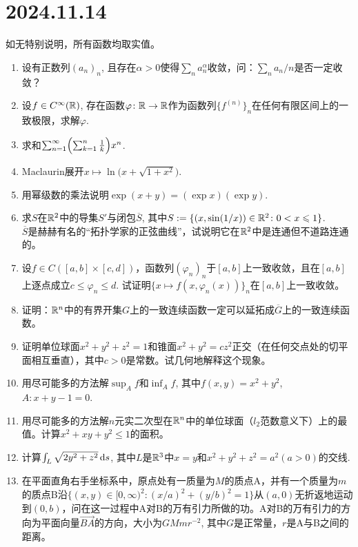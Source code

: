 \section*{2024.11.14}
如无特别说明，所有函数均取实值。
\begin{enumerate}
    \item 设有正数列$(a_n)_n$, 且存在$\alpha>0$使得$\sum_{n} a_n^\alpha$收敛，问：$\sum_{n}a_n/n$是否一定收敛？
    \item 设$f\in C^\infty(\mathbb{R})$, 存在函数$\varphi\colon\mathbb{R}\to\mathbb{R}$作为函数列$\bigl\{f^{(n)}\bigr\}_n$在任何有限区间上的一致极限，求解$\varphi$.
    \item 求和$\sum_{n=1}^\infty \Bigl(\sum_{k=1}^{n}\frac{1}{k}\Bigr) x^n$.
    \item Maclaurin展开$x\mapsto \ln \bigl(x+\sqrt{1+x^2}\bigr)$.
    \item 用幂级数的乘法说明$\exp (x+y)=(\exp x)(\exp y)$.
    \item 求$S$在$\mathbb{R}^2$中的导集$S'$与闭包$\overline S$, 其中$S:=\{(x,\sin (1/x))\in\mathbb{R}^2\colon 0<x\leqslant1\}$.\\
    $\overline S$是赫赫有名的``拓扑学家的正弦曲线''，试说明它在$\mathbb{R}^2$中是连通但不道路连通的。
    \item 设$f\in C([a,b]\times[c,d])$，函数列$(\varphi_n)_n$于$[a,b]$上一致收敛，且在$[a,b]$上逐点成立$c\leqslant \varphi_n\leqslant d$. 试证明$\bigl\{x\mapsto f(x,\varphi_n(x))\bigr\}_n$在$[a,b]$上一致收敛。
    \item 证明：$\mathbb{R}^n$中的有界开集$G$上的一致连续函数一定可以延拓成$\overline G$上的一致连续函数。
    \item 证明单位球面$x^2+y^2+z^2=1$和锥面$x^2+y^2=cz^2$正交（在任何交点处的切平面相互垂直），其中$c>0$是常数。试几何地解释这个现象。
    \item 用尽可能多的方法解$\sup_{A}f$和$\inf_{A}f$, 其中$f(x,y)=x^2+y^2$, $A\colon x+y-1=0$.
    \item 用尽可能多的方法解$n$元实二次型在$\mathbb{R}^n$中的单位球面（$l_2$范数意义下）上的最值。计算$x^2+xy+y^2\leqslant 1$的面积。
    \item 计算$\int_L \sqrt{2y^2+z^2}\mathop{}\!\mathrm{d} s$, 其中$
        L$是$\mathbb{R}^3$中$x=y$和$x^2+y^2+z^2=a^2(a>0)$的交线.
    \item 在平面直角右手坐标系中，原点处有一质量为$M$的质点A，并有一个质量为$m$的质点B沿$\{(x,y)\in [0,\infty)^2\colon (x/a)^2+(y/b)^2=1\}$从$(a,0)$无折返地运动到$(0,b)$，问在这一过程中A对B的万有引力所做的功。A对B的万有引力的方向为平面向量$\overrightarrow{BA}$的方向，大小为$GMmr^{-2}$, 其中$G$是正常量，$r$是A与B之间的距离。

\end{enumerate}
